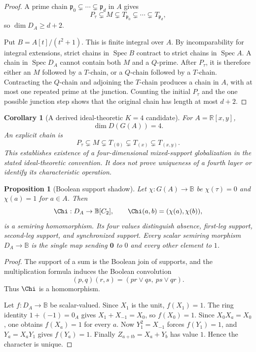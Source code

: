 \documentclass[11pt]{article}
\newtheorem{proposition}[definition]{Proposition}
\newtheorem{corollary}[definition]{Corollary}
\newcommand{\B}{\mathbb B}
\newcommand{\R}{\mathbb R}
\newcommand{\Spec}{\operatorname{Spec}}
\begin{document}
\begin{proof}
A prime chain $\mathfrak p_0\subsetneq\cdots\subsetneq\mathfrak p_d$ in $A$ gives
\[
P_\tau\subsetneq M\subsetneq T_{\mathfrak p_0}\subsetneq\cdots\subsetneq T_{\mathfrak p_d},
\]
so $\dim D_A\ge d+2$.

Put $B=A[t]/(t^2+1)$.  This is finite integral over $A$.  By incomparability for integral extensions, strict chains in $\Spec B$ contract to strict chains in $\Spec A$.  A chain in $\Spec D_A$ cannot contain both $M$ and a $Q$-prime.  After $P_\tau$, it is therefore either an $M$ followed by a $T$-chain, or a $Q$-chain followed by a $T$-chain.  Contracting the $Q$-chain and adjoining the $T$-chain produces a chain in $A$, with at most one repeated prime at the junction.  Counting the initial $P_\tau$ and the one possible junction step shows that the original chain has length at most $d+2$.
\end{proof}

\begin{corollary}[A derived ideal-theoretic $K=4$ candidate]
For $A=\R[x,y]$,
\[
\dim D(G(A))=4.
\]
An explicit chain is
\[
P_\tau\subsetneq M\subsetneq T_{(0)}\subsetneq T_{(x)}\subsetneq T_{(x,y)}.
\]
This establishes existence of a four-dimensional mixed-support globalization in the stated ideal-theoretic convention.  It does not prove uniqueness of a fourth layer or identify its characteristic operation.
\end{corollary}

\begin{proposition}[Boolean support shadow]
Let $\chi:G(A)\to\B$ be $\chi(\tau)=0$ and $\chi(a)=1$ for $a\in A$.  Then
\[
\Chi:D_A\to\B[C_2],\qquad \Chi(a,b)=(\chi(a),\chi(b)),
\]
is a semiring homomorphism.  Its four values distinguish absence, first-leg support, second-leg support, and synchronized support.  Every scalar semiring morphism $D_A\to\B$ is the single map sending $\mathbf0$ to $0$ and every other element to $1$.
\end{proposition}

\begin{proof}
The support of a sum is the Boolean join of supports, and the multiplication formula induces the Boolean convolution
\[
(p,q)(r,s)=(pr\vee qs,\ ps\vee qr).
\]
Thus $\Chi$ is a homomorphism.

Let $f:D_A\to\B$ be scalar-valued.  Since $X_1$ is the unit, $f(X_1)=1$.  The ring identity $1+(-1)=0_A$ gives $X_1+X_{-1}=X_0$, so $f(X_0)=1$.  Since $X_0X_a=X_0$, one obtains $f(X_a)=1$ for every $a$.  Now $Y_1^2=X_{-1}$ forces $f(Y_1)=1$, and $Y_a=X_aY_1$ gives $f(Y_a)=1$.  Finally $Z_{a+tb}=X_a+Y_b$ has value $1$.  Hence the character is unique.
\end{proof}
\end{document}
